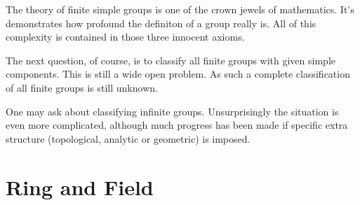 \documentclass{article}
\begin{document}
The theory of finite simple groups is one of the crown jewels of mathematics. It's demonstrates how profound the definiton of a group really is. All of this complexity is contained in those three innocent axioms.

The next question, of course, is to classify all finite groups with given simple components. This is still a wide open problem. As such a complete classification of all finite groups is still unknown.

One may ask about classifying infinite groups. Unsurprisingly the situation is even more complicated, although much progress has been made if specific extra structure (topological, analytic or geometric) is imposed.

\newpage
\section{Ring and Field}
\end{document}
